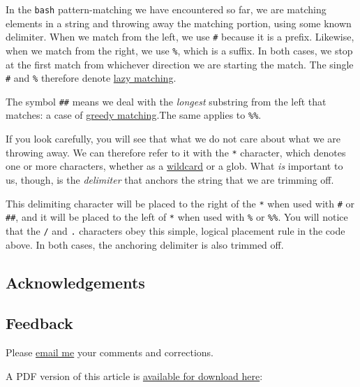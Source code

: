 \documentclass[
  a4paper,
]{article}
\begin{document}
In the \texttt{bash} pattern-matching we have encountered so far, we are
matching elements in a string and throwing away the matching portion,
using some known delimiter. When we match from the left, we use
\texttt{\#} because it is a prefix. Likewise, when we match from the
right, we use \texttt{\%}, which is a suffix. In both cases, we stop at
the first match from whichever direction we are starting the match. The
single \texttt{\#} and \texttt{\%} therefore denote
\href{https://stackoverflow.com/questions/2301285/what-do-lazy-and-greedy-mean-in-the-context-of-regular-expressions}{lazy
matching}.

The symbol \texttt{\#\#} means we deal with the \emph{longest} substring
from the left that matches: a case of
\href{https://www.geeksforgeeks.org/perl-greedy-and-non-greedy-match/}{greedy
matching}.The same applies to \texttt{\%\%}.

If you look carefully, you will see that what we do not care about what
we are throwing away. We can therefore refer to it with the \texttt{*}
character, which denotes one or more characters, whether as a
\href{https://en.wikipedia.org/wiki/Wildcard_character}{wildcard} or a
glob. What \emph{is} important to us, though, is the \emph{delimiter}
that anchors the string that we are trimming off.

This delimiting character will be placed to the right of the \texttt{*}
when used with \texttt{\#} or \texttt{\#\#}, and it will be placed to
the left of \texttt{*} when used with \texttt{\%} or \texttt{\%\%}. You
will notice that the \texttt{/} and \texttt{.} characters obey this
simple, logical placement rule in the code above. In both cases, the
anchoring delimiter is also trimmed off.

\hypertarget{acknowledgements}{%
\subsection{Acknowledgements}\label{acknowledgements}}

\hypertarget{feedback}{%
\subsection{Feedback}\label{feedback}}

Please \href{mailto:feedback.swanlotus@gmail.com}{email me} your
comments and corrections.

\noindent A PDF version of this article is
\href{./pattern-matching-in-bash.pdf}{available for download here}:
\end{document}
